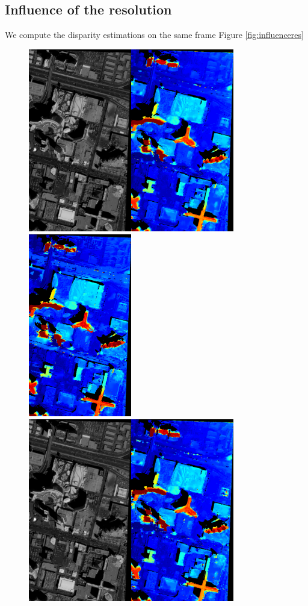 \documentclass{article}
\theoremstyle{definition}
\begin{document}
\subsection{Influence of the resolution}


We compute the disparity estimations on the same frame Figure \ref{fig:influenceres}


\begin{figure}[ht]
 \centering
 \includegraphics[height=8cm]{images/SkysatLR18_240_img/1521805051081_dmap_050.png}\hspace{-0.28em}
 \includegraphics[height=8cm]{images/SkysatHR18_240/1521744514157_dmap_050.png}\\
 \vspace{1em}
 \includegraphics[height=8cm]{images/SkysatLR18_240_img/1521805051081_dmap_025.png}\hspace{-0.28em}

\end{figure}
\end{document}
